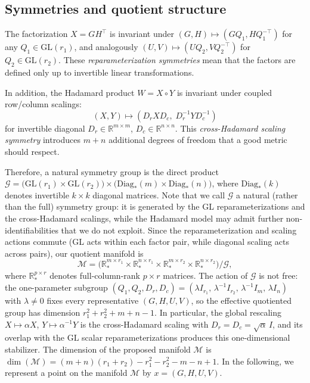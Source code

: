 \documentclass[letterpaper, 10 pt, conference]{ieeeconf}
\newcommand{\R}{\mathbb{R}}
\newcommand{\cM}{\mathcal{M}}
\newcommand{\cG}{\mathcal{G}}
\newcommand{\Had}{\circ}
\theoremstyle{plain}
\theoremstyle{definition}
\theoremstyle{remark}
\begin{document}

\subsection{Symmetries and quotient structure}

The factorization $X = GH^\top$ is invariant under $(G,H)\mapsto(GQ_1, HQ_1^{-\top})$ for any $Q_1\in\mathrm{GL}(r_1)$, and analogously $(U,V)\mapsto(UQ_2, VQ_2^{-\top})$ for $Q_2\in\mathrm{GL}(r_2)$.
These \emph{reparameterization symmetries} mean that the factors are defined only up to invertible linear transformations.

In addition, the Hadamard product $W = X\Had Y$ is invariant under coupled row/column scalings:
\begin{equation}
  (X,Y)\mapsto(D_r X D_c,\; D_r^{-1}YD_c^{-1})
  \label{eq:cross_scaling}
\end{equation}
for invertible diagonal $D_r\in\R^{m\times m}$, $D_c\in\R^{n\times n}$.
This \emph{cross-Hadamard scaling symmetry} introduces $m+n$ additional degrees of freedom that a good metric should respect.

Therefore, a natural symmetry group is the direct product $\cG = \bigl(\mathrm{GL}(r_1)\times\mathrm{GL}(r_2)\bigr)\times\bigl(\mathrm{Diag}_*(m)\times\mathrm{Diag}_*(n)\bigr)$,
where $\mathrm{Diag}_*(k)$ denotes invertible $k\times k$ diagonal matrices. Note that we call $\cG$ a natural (rather than the full) symmetry group: it is generated by the GL reparameterizations and the cross-Hadamard scalings, while the Hadamard model may admit further non-identifiabilities that we do not exploit.
Since the reparameterization and scaling actions commute (\textrm{GL} acts within each factor pair, while diagonal scaling acts across pairs), our quotient manifold is
\begin{equation}
  \cM = \bigl(\R_*^{m\times r_1}\!\times\R_*^{n\times r_1}\times\R_*^{m\times r_2}\!\times\R_*^{n\times r_2}\bigr)\big/\cG,
\end{equation}
where $\R_*^{p\times r}$ denotes full-column-rank $p\times r$ matrices. The action of $\cG$ is not free: the one-parameter subgroup $(Q_1,Q_2,D_r,D_c) = (\lambda I_{r_1},\, \lambda^{-1} I_{r_2},\, \lambda^{-1} I_m,\, \lambda I_n)$ with $\lambda\neq 0$ fixes every representative $(G,H,U,V)$, so the effective quotiented group has dimension $r_1^2 + r_2^2 + m + n - 1$. In particular, the global rescaling $X\mapsto\alpha X$, $Y\mapsto\alpha^{-1}Y$ is the cross-Hadamard scaling with $D_r=D_c=\sqrt{\alpha}\,I$, and its overlap with the $\mathrm{GL}$ scalar reparameterizations produces this one-dimensional stabilizer. The dimension of the proposed manifold $\cM$ is $\dim(\cM) = (m{+}n)(r_1{+}r_2) - r_1^2 - r_2^2 - m - n {}+ 1$. In the following, we represent a point on the manifold $\cM$ by $x = (G,H,U,V)$.
\end{document}
